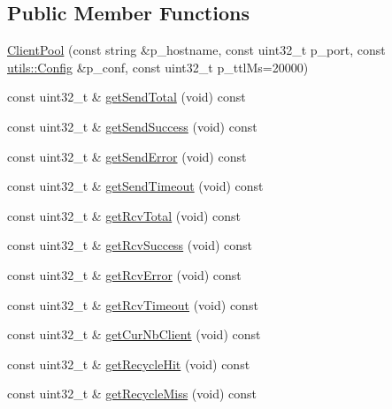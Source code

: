\subsection*{Public Member Functions}
\begin{DoxyCompactItemize}
\item 
\hyperlink{classxtd_1_1network_1_1bip_1_1ClientPool_a19357fadc950be3b681e4c13b602b9ff}{Client\+Pool} (const string \&p\+\_\+hostname, const uint32\+\_\+t p\+\_\+port, const \hyperlink{classxtd_1_1network_1_1utils_1_1Config}{utils\+::\+Config} \&p\+\_\+conf, const uint32\+\_\+t p\+\_\+ttl\+Ms=20000)
\item 
const uint32\+\_\+t \& \hyperlink{classxtd_1_1network_1_1bip_1_1ClientPool_ac38bce359cae12634348f3baceb31668}{get\+Send\+Total} (void) const 
\item 
const uint32\+\_\+t \& \hyperlink{classxtd_1_1network_1_1bip_1_1ClientPool_ae744842f18c70979bf792d10fe799716}{get\+Send\+Success} (void) const 
\item 
const uint32\+\_\+t \& \hyperlink{classxtd_1_1network_1_1bip_1_1ClientPool_a48e713a842d7d5bf0c9142d4f65ab719}{get\+Send\+Error} (void) const 
\item 
const uint32\+\_\+t \& \hyperlink{classxtd_1_1network_1_1bip_1_1ClientPool_a65c430ef8ee5a65ec6289ea554df9ccf}{get\+Send\+Timeout} (void) const 
\item 
const uint32\+\_\+t \& \hyperlink{classxtd_1_1network_1_1bip_1_1ClientPool_aae35b25fd8d491a7b4e42dcb3b00dbc8}{get\+Rcv\+Total} (void) const 
\item 
const uint32\+\_\+t \& \hyperlink{classxtd_1_1network_1_1bip_1_1ClientPool_a118010103ded46a9d997765e74a9fddf}{get\+Rcv\+Success} (void) const 
\item 
const uint32\+\_\+t \& \hyperlink{classxtd_1_1network_1_1bip_1_1ClientPool_a44f712ba35d274fcb093c55f197539da}{get\+Rcv\+Error} (void) const 
\item 
const uint32\+\_\+t \& \hyperlink{classxtd_1_1network_1_1bip_1_1ClientPool_abdb1cb0ea47af82189a3df7e074ba123}{get\+Rcv\+Timeout} (void) const 
\item 
const uint32\+\_\+t \& \hyperlink{classxtd_1_1network_1_1bip_1_1ClientPool_a70de85e8b181bd82214bff2aa27600f1}{get\+Cur\+Nb\+Client} (void) const 
\item 
const uint32\+\_\+t \& \hyperlink{classxtd_1_1network_1_1bip_1_1ClientPool_a616b3398d55725cdf1cee89a9c7f1154}{get\+Recycle\+Hit} (void) const 
\item 
const uint32\+\_\+t \& \hyperlink{classxtd_1_1network_1_1bip_1_1ClientPool_a0432fecefc0e16d58581e71d9796a423}{get\+Recycle\+Miss} (void) const 

\end{DoxyCompactItemize}
